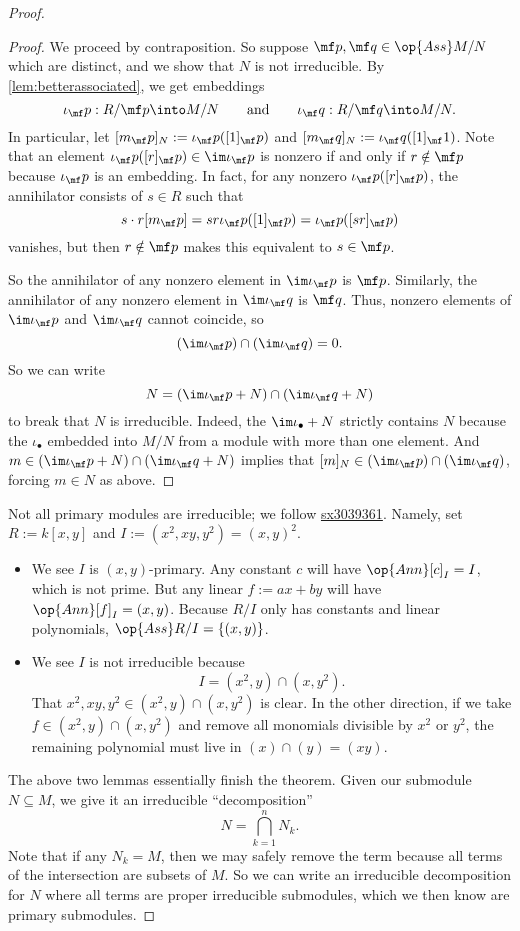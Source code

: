 \documentclass[../notes.tex]{subfiles}
\begin{document}
\begin{proof}
\begin{proof}
		We proceed by contraposition. So suppose $\mf p,\mf q\in\op{Ass}M/N$ which are distinct, and we show that $N$ is not irreducible. By \autoref{lem:betterassociated}, we get embeddings
		\[\iota_\mf p:R/\mf p\into M/N\qquad\text{and}\qquad \iota_\mf q:R/\mf q\into M/N.\]
		In particular, let $[m_\mf p]_N:=\iota_\mf p([1]_\mf p)$ and $[m_\mf q]_N:=\iota_\mf q([1]_\mf 1)$. Note that an element $\iota_\mf p([r]_\mf p)\in\im\iota_\mf p$ is nonzero if and only if $r\notin\mf p$ because $\iota_\mf p$ is an embedding. In fact, for any nonzero $\iota_\mf p([r]_\mf p)$, the annihilator consists of $s\in R$ such that
		\[s\cdot r[m_\mf p]=sr\iota_\mf p([1]_\mf p)=\iota_\mf p([sr]_\mf p)\]
		vanishes, but then $r\notin\mf p$ makes this equivalent to $s\in\mf p$.

		So the annihilator of any nonzero element in $\im\iota_\mf p$ is $\mf p$. Similarly, the annihilator of any nonzero element in $\im\iota_\mf q$ is $\mf q$. Thus, nonzero elements of $\im\iota_\mf p$ and $\im\iota_\mf q$ cannot coincide, so
		\[(\im\iota_\mf p)\cap(\im\iota_\mf q)=0.\]
		So we can write
		\[N=(\im\iota_\mf p+N)\cap(\im\iota_\mf q+N)\]
		to break that $N$ is irreducible. Indeed, the $\im\iota_\bullet+N$ strictly contains $N$ because the $\iota_\bullet$ embedded into $M/N$ from a module with more than one element. And $m\in(\im\iota_\mf p+N)\cap(\im\iota_\mf q+N)$ implies that $[m]_N\in(\im\iota_\mf p)\cap(\im\iota_\mf q)$, forcing $m\in N$ as above.
	\end{proof}
	\begin{remark}
		Not all primary modules are irreducible; we follow \href{https://math.stackexchange.com/a/3040085/869257}{sx3039361}. Namely, set $R:=k[x,y]$ and $I:=(x^2,xy,y^2)=(x,y)^2$.
		\begin{itemize}
			\item We see $I$ is $(x,y)$-primary. Any constant $c$ will have $\op{Ann}[c]_I=I$, which is not prime. But any linear $f:=ax+by$ will have $\op{Ann}[f]_I=(x,y)$. Because $R/I$ only has constants and linear polynomials, $\op{Ass}R/I=\{(x,y)\}$.
			\item We see $I$ is not irreducible because
			\[I=\left(x^2,y\right)\cap\left(x,y^2\right).\]
			That $x^2,xy,y^2\in\left(x^2,y\right)\cap\left(x,y^2\right)$ is clear. In the other direction, if we take $f\in\left(x^2,y\right)\cap\left(x,y^2\right)$ and remove all monomials divisible by $x^2$ or $y^2$, the remaining polynomial must live in $(x)\cap(y)=(xy)$.
		\end{itemize}
	\end{remark}
	The above two lemmas essentially finish the theorem. Given our submodule $N\subseteq M$, we give it an irreducible ``decomposition''
	\[N=\bigcap_{k=1}^nN_k.\]
	Note that if any $N_k=M$, then we may safely remove the term because all terms of the intersection are subsets of $M$. So we can write an irreducible decomposition for $N$ where all terms are proper irreducible submodules, which we then know are primary submodules.
\end{proof}
\end{document}
